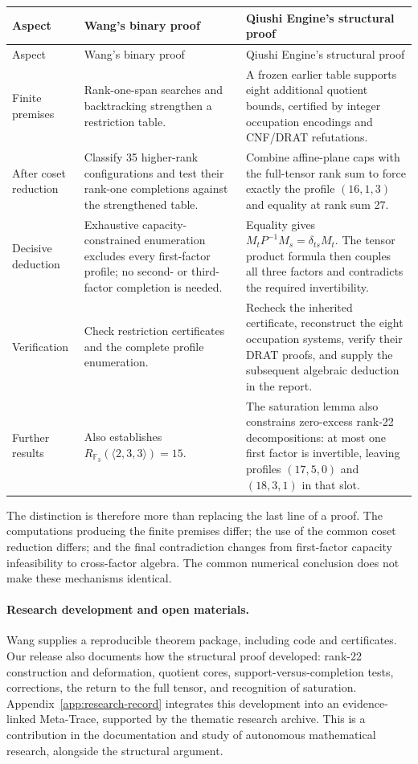 \begin{longtable}{@{}L{2.1cm}L{5.7cm}L{6.4cm}@{}}
\toprule
Aspect & Wang's binary proof & Qiushi Engine's structural proof\\
\midrule
\endfirsthead
\toprule Aspect & Wang's binary proof & Qiushi Engine's structural proof\\\midrule
\endhead
\bottomrule\endfoot
Finite premises
& Rank-one-span searches and backtracking strengthen a restriction table.
& A frozen earlier table supports eight additional quotient bounds,
certified by integer occupation encodings and CNF/DRAT refutations.\\
After coset reduction
& Classify 35 higher-rank configurations and test their rank-one
completions against the strengthened table.
& Combine affine-plane caps with the full-tensor rank sum to force
exactly the profile $(16,1,3)$ and equality at rank sum 27.\\
Decisive deduction
& Exhaustive capacity-constrained enumeration excludes every first-factor
profile; no second- or third-factor completion is needed.
& Equality gives $M_tP^{-1}M_s=\delta_{ts}M_t$. The tensor product formula
then couples all three factors and contradicts the required invertibility.\\
Verification
& Check restriction certificates and the complete profile enumeration.
& Recheck the inherited certificate, reconstruct the eight occupation
systems, verify their DRAT proofs, and supply the subsequent algebraic
deduction in the report.\\
Further results
& Also establishes $R_{\mathbb F_3}(\langle2,3,3\rangle)=15$.
& The saturation lemma also constrains zero-excess rank-22 decompositions:
at most one first factor is invertible, leaving profiles $(17,5,0)$ and
$(18,3,1)$ in that slot.\\
\end{longtable}

The distinction is therefore more than replacing the last line of a
proof. The computations producing the finite premises differ; the use of
the common coset reduction differs; and the final contradiction changes
from first-factor capacity infeasibility to cross-factor algebra.
The common numerical conclusion does not make these mechanisms identical.

\paragraph{Research development and open materials.}
Wang supplies a reproducible theorem package, including code and
certificates. Our release also documents how the structural proof
developed: rank-22 construction and deformation, quotient cores,
support-versus-completion tests, corrections, the return to the full
tensor, and recognition of saturation. Appendix~\ref{app:research-record}
integrates this development into an evidence-linked Meta-Trace, supported
by the thematic research archive. This is a contribution in the
documentation and study of autonomous mathematical research, alongside
the structural argument.

